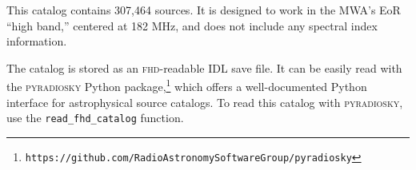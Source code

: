 \documentclass[a4paper,11pt]{article}
\begin{document}
This catalog contains 307,464 sources. It is designed to work in the MWA's EoR ``high band,'' centered at 182 MHz, and does not include any spectral index information.

The catalog is stored as an \textsc{fhd}-readable IDL save file. It can be easily read with the \textsc{pyradiosky} Python package,\footnote{\texttt{https://github.com/RadioAstronomySoftwareGroup/pyradiosky}} which offers a well-documented Python interface for astrophysical source catalogs. To read this catalog with \textsc{pyradiosky}, use the \texttt{read\_fhd\_catalog} function.
\end{document}
